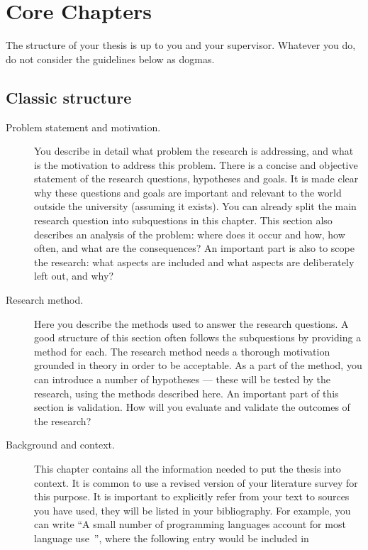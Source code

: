 \documentclass{uvamscse}
\begin{document}
\chapter{Core Chapters}

The structure of your thesis is up to you and your supervisor. Whatever you
do, do not consider the guidelines below as dogmas.

\section{Classic structure}

\begin{description}
  \item[Problem statement and motivation.]
  You describe in detail what problem the research is addressing, and what is
the motivation to address this problem. There is a concise and objective
statement of the research questions, hypotheses and goals. It is made clear
why these questions and goals are important and relevant to the world outside
the university (assuming it exists). You can already split the main research
question into subquestions in this chapter. This section also describes an
analysis of the problem: where does it occur and how, how often, and what are
the consequences? An important part is also to scope the research: what
aspects are included and what aspects are deliberately left out, and why?
  \item[Research method.]
  Here you describe the methods used to answer the research questions. A good
structure of this section often follows the subquestions by providing a method
for each. The research method needs a thorough motivation grounded in theory
in order to be acceptable. As a part of the method, you can introduce a number
of hypotheses --- these will be tested by the research, using the methods
described here. An important part of this section is validation. How will you
evaluate and validate the outcomes of the research?
  \item[Background and context.]
  This chapter contains all the information needed to put the thesis into
context. It is common to use a revised version of your literature survey for
this purpose. It is important to explicitly refer from your text to sources
you have used, they will be listed in your bibliography. For example, you can
write ``A small number of programming languages account for most language
use~\cite{MeyerovichR2013}'', where the following entry would be included in

\end{description}
\end{document}
